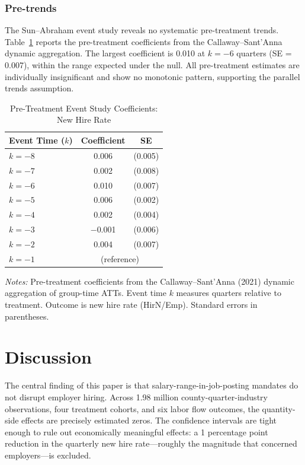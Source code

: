 \documentclass[12pt]{article}
\begin{document}
\subsubsection*{Pre-trends} The Sun--Abraham event study reveals no systematic pre-treatment trends. Table~\ref{tab:pretrends} reports the pre-treatment coefficients from the Callaway--Sant'Anna dynamic aggregation. The largest coefficient is 0.010 at $k = -6$ quarters (SE = 0.007), within the range expected under the null. All pre-treatment estimates are individually insignificant and show no monotonic pattern, supporting the parallel trends assumption.

\begin{table}[H]
\centering
\caption{Pre-Treatment Event Study Coefficients: New Hire Rate}
\label{tab:pretrends}
\begin{threeparttable}
\begin{tabular}{lcc}
\toprule
Event Time ($k$) & Coefficient & SE \\
\midrule
$k = -8$ & 0.006 & (0.005) \\
$k = -7$ & 0.002 & (0.008) \\
$k = -6$ & 0.010 & (0.007) \\
$k = -5$ & 0.006 & (0.002) \\
$k = -4$ & 0.002 & (0.004) \\
$k = -3$ & $-$0.001 & (0.006) \\
$k = -2$ & 0.004 & (0.007) \\
$k = -1$ & \multicolumn{2}{c}{(reference)} \\
\bottomrule
\end{tabular}
\begin{tablenotes}[flushleft]
\small
\item \textit{Notes:} Pre-treatment coefficients from the Callaway--Sant'Anna (2021) dynamic aggregation of group-time ATTs. Event time $k$ measures quarters relative to treatment. Outcome is new hire rate (HirN/Emp). Standard errors in parentheses.
\end{tablenotes}
\end{threeparttable}
\end{table}


\section{Discussion}

The central finding of this paper is that salary-range-in-job-posting mandates do not disrupt employer hiring. Across 1.98 million county-quarter-industry observations, four treatment cohorts, and six labor flow outcomes, the quantity-side effects are precisely estimated zeros. The confidence intervals are tight enough to rule out economically meaningful effects: a 1 percentage point reduction in the quarterly new hire rate---roughly the magnitude that concerned employers---is excluded.
\end{document}
